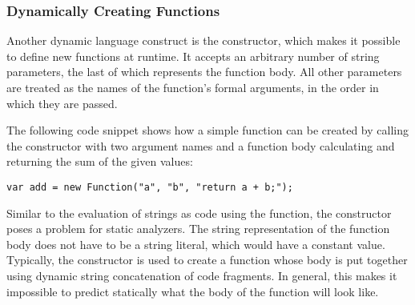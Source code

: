 \subsubsection{Dynamically Creating Functions}

Another dynamic language construct is the  constructor, which makes it possible to define new functions at runtime. It accepts an arbitrary number of string parameters, the last of which represents the function body. All other parameters are treated as the names of the function's formal arguments, in the order in which they are passed. \cite{mdn-function}

The following code snippet shows how a simple  function can be created by calling the  constructor with two argument names and a function body calculating and returning the sum of the given values:

\begin{verbatim}
var add = new Function("a", "b", "return a + b;");
\end{verbatim}

Similar to the evaluation of strings as code using the  function, the  constructor poses a problem for static analyzers. The string representation of the function body does not have to be a string literal, which would have a constant value. Typically, the  constructor is used to create a function whose body is put together using dynamic string concatenation of code fragments. In general, this makes it impossible to predict statically what the body of the function will look like.
